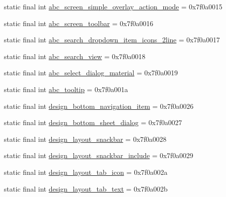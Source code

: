 \begin{DoxyCompactItemize}
\item 
static final int \mbox{\hyperlink{classandroid_1_1support_1_1design_1_1_r_1_1layout_a3098585a2f723080061fd42dd4d91d94}{abc\+\_\+screen\+\_\+simple\+\_\+overlay\+\_\+action\+\_\+mode}} = 0x7f0a0015
\item 
static final int \mbox{\hyperlink{classandroid_1_1support_1_1design_1_1_r_1_1layout_a27b17cd1e50e5101addd868ef7348ead}{abc\+\_\+screen\+\_\+toolbar}} = 0x7f0a0016
\item 
static final int \mbox{\hyperlink{classandroid_1_1support_1_1design_1_1_r_1_1layout_ac425206367179409e7f02a364f820c2f}{abc\+\_\+search\+\_\+dropdown\+\_\+item\+\_\+icons\+\_\+2line}} = 0x7f0a0017
\item 
static final int \mbox{\hyperlink{classandroid_1_1support_1_1design_1_1_r_1_1layout_aaddf023060f3d2bcf6aeaa8a47cba6da}{abc\+\_\+search\+\_\+view}} = 0x7f0a0018
\item 
static final int \mbox{\hyperlink{classandroid_1_1support_1_1design_1_1_r_1_1layout_a4138a3a5dbeee0c457208d182140fff7}{abc\+\_\+select\+\_\+dialog\+\_\+material}} = 0x7f0a0019
\item 
static final int \mbox{\hyperlink{classandroid_1_1support_1_1design_1_1_r_1_1layout_ad2cfe71c4ebbf9cc97c0d182461a9705}{abc\+\_\+tooltip}} = 0x7f0a001a
\item 
static final int \mbox{\hyperlink{classandroid_1_1support_1_1design_1_1_r_1_1layout_a92dd59bbbfd48a7d7ef64c8e52a1e34e}{design\+\_\+bottom\+\_\+navigation\+\_\+item}} = 0x7f0a0026
\item 
static final int \mbox{\hyperlink{classandroid_1_1support_1_1design_1_1_r_1_1layout_ab3671735991f403412ea91ffc3af61c1}{design\+\_\+bottom\+\_\+sheet\+\_\+dialog}} = 0x7f0a0027
\item 
static final int \mbox{\hyperlink{classandroid_1_1support_1_1design_1_1_r_1_1layout_a8d7f864b1731af8b70ca0654071ad76e}{design\+\_\+layout\+\_\+snackbar}} = 0x7f0a0028
\item 
static final int \mbox{\hyperlink{classandroid_1_1support_1_1design_1_1_r_1_1layout_a98d09e99d5eb781fb883b7b11df24dd6}{design\+\_\+layout\+\_\+snackbar\+\_\+include}} = 0x7f0a0029
\item 
static final int \mbox{\hyperlink{classandroid_1_1support_1_1design_1_1_r_1_1layout_a736d88071f77d19d86aa429d88c05d80}{design\+\_\+layout\+\_\+tab\+\_\+icon}} = 0x7f0a002a
\item 
static final int \mbox{\hyperlink{classandroid_1_1support_1_1design_1_1_r_1_1layout_a25a0ff3a8a0971cf70afd38cceec34ee}{design\+\_\+layout\+\_\+tab\+\_\+text}} = 0x7f0a002b

\end{DoxyCompactItemize}
